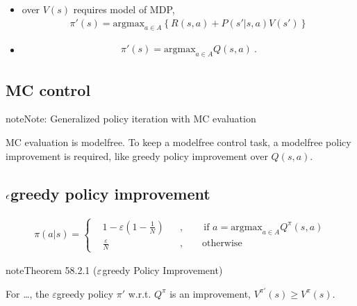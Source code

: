 \documentclass[letterpaper,10pt,english]{jupyterBook}
\begin{document}
\sphinxAtStartPar
{}
\begin{itemize}
\item {} 
\sphinxAtStartPar
over \(V(s)\) requires model of MDP,
\begin{equation*}
\begin{split}\pi'(s) = \text{argmax}_{a \in A} \left\{ R(s,a) + P(s'|s,a) V(s') \right\} \end{split}
\end{equation*}
\item {} 
\sphinxAtStartPar
{}
\begin{equation*}
\begin{split}\pi'(s) = \text{argmax}_{a \in A} Q(s,a) \ .\end{split}
\end{equation*}
\end{itemize}


\subsection{MC control}
\label{\detokenize{ch/rl/mdp_sol_rl:mc-control}}\label{\detokenize{ch/rl/mdp_sol_rl:rl-mdp-sol-rl-control-mc}}
\begin{sphinxadmonition}{note}{Note:}
\sphinxAtStartPar
Generalized policy iteration with MC evaluation

\sphinxAtStartPar
MC evaluation is model\sphinxhyphen{}free. To keep a model\sphinxhyphen{}free control task, a model\sphinxhyphen{}free policy improvement is required, like greedy policy improvement over \(Q(s,a)\).
\end{sphinxadmonition}


\subsection{\protect\(\epsilon\protect\)\sphinxhyphen{}greedy policy improvement }
\label{\detokenize{ch/rl/mdp_sol_rl:epsilon-greedy-policy-improvement-varepsilon-greedy-policy-improvement}}\label{\detokenize{ch/rl/mdp_sol_rl:rl-mdp-sol-rl-control-improv-eps-greedy}}\begin{equation*}
\begin{split}
\pi(a|s) = \left\{
\begin{aligned}
  & 1 - \varepsilon \left( 1 - \frac{1}{N} \right) && , \qquad  \text{if } a = \text{argmax}_{a \in A} Q^{\pi}(s,a) \\
  & \frac{\varepsilon}{N} && , \qquad \text{otherwise}
\end{aligned}
\right.
\end{split}
\end{equation*}\label{ch/rl/mdp_sol_rl:theorem-0}
\begin{sphinxadmonition}{note}{Theorem 58.2.1 (\protect\(\varepsilon\protect\)\sphinxhyphen{}greedy Policy Improvement)}



\sphinxAtStartPar
For …, the \(\varepsilon\)\sphinxhyphen{}greedy policy \(\pi'\) w.r.t. \(Q^{\pi}\) is an improvement, \(V^{\pi'}(s) \ge V^{\pi}(s)\).
\end{sphinxadmonition}
\end{document}
